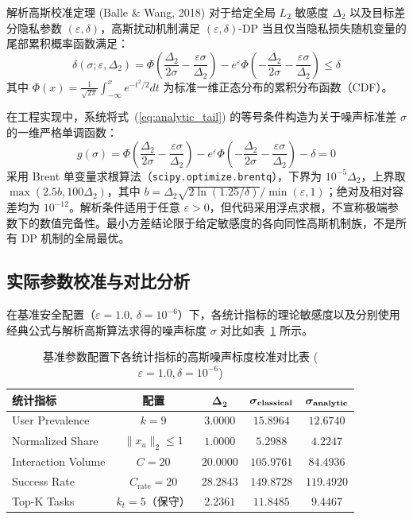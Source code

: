 \begin{techbox}{解析高斯校准定理 (Balle \& Wang, 2018)}
对于给定全局 $L_2$ 敏感度 $\Delta_2$ 以及目标差分隐私参数 $(\varepsilon, \delta)$，高斯扰动机制满足 $(\varepsilon, \delta)$-DP 当且仅当隐私损失随机变量的尾部累积概率函数满足：
\begin{equation}
  \label{eq:analytic_tail}
  \delta(\sigma; \varepsilon, \Delta_2) = \Phi\left(\frac{\Delta_2}{2\sigma} - \frac{\varepsilon\sigma}{\Delta_2}\right) - e^\varepsilon \Phi\left(-\frac{\Delta_2}{2\sigma} - \frac{\varepsilon\sigma}{\Delta_2}\right) \le \delta
\end{equation}
其中 $\Phi(x) = \frac{1}{\sqrt{2\pi}} \int_{-\infty}^x e^{-t^2/2} dt$ 为标准一维正态分布的累积分布函数（CDF）。
\end{techbox}

在工程实现中，系统将式~(\ref{eq:analytic_tail}) 的等号条件构造为关于噪声标准差 $\sigma$ 的一维严格单调函数：
\begin{equation}
  g(\sigma) = \Phi\left(\frac{\Delta_2}{2\sigma} - \frac{\varepsilon\sigma}{\Delta_2}\right) - e^\varepsilon \Phi\left(-\frac{\Delta_2}{2\sigma} - \frac{\varepsilon\sigma}{\Delta_2}\right) - \delta = 0
\end{equation}
采用 Brent 单变量求根算法（\texttt{scipy.optimize.}\allowbreak\texttt{brentq}），下界为 $10^{-5}\Delta_2$，上界取 $\max(2.5b,100\Delta_2)$，其中 $b=\Delta_2\sqrt{2\ln(1.25/\delta)}/\min(\varepsilon,1)$；绝对及相对容差均为 $10^{-12}$。解析条件适用于任意 $\varepsilon>0$，但代码采用浮点求根，不宣称极端参数下的数值完备性。最小方差结论限于给定敏感度的各向同性高斯机制族，不是所有 DP 机制的全局最优。

\subsection{实际参数校准与对比分析}
在基准安全配置（$\varepsilon = 1.0, \, \delta = 10^{-6}$）下，各统计指标的理论敏感度以及分别使用经典公式与解析高斯算法求得的噪声标度 $\sigma$ 对比如表~\ref{tab:sigma_comparison} 所示。

\begin{table}[htbp]
\centering
\small
\caption{基准参数配置下各统计指标的高斯噪声标度校准对比表 ($\varepsilon=1.0, \delta=10^{-6}$)}
\label{tab:sigma_comparison}
\begin{tabularx}{\textwidth}{Xcccc}
\toprule
\textbf{统计指标} & \textbf{配置} & $\boldsymbol{\Delta_2}$ & $\boldsymbol{\sigma_{\rm classical}}$ & $\boldsymbol{\sigma_{\rm analytic}}$ \\
\midrule
User Prevalence & $k=9$ & $3.0000$ & $15.8964$ & $12.6740$ \\
Normalized Share & $\|x_u\|_2\le1$ & $1.0000$ & $5.2988$ & $4.2247$ \\
Interaction Volume & $C=20$ & $20.0000$ & $105.9761$ & $84.4936$ \\
Success Rate & $C_{\text{rate}}=20$ & $28.2843$ & $149.8728$ & $119.4920$ \\
Top-K Tasks & $k_t=5$（保守） & $2.2361$ & $11.8485$ & $9.4467$ \\
\bottomrule
\end{tabularx}
\end{table}

